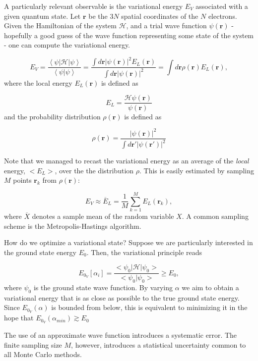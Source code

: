 \documentclass[10pt]{article}
\begin{document}
A particularly relevant observable is the variational energy $E_V$ associated with a given quantum state. Let $\bm r$ be the $3N$ spatial coordinates of the $N$ electrons. Given the Hamiltonian of the system $\mathcal{H}$, and a trial wave function $\psi (\bm r)$ - hopefully a good guess of the wave function representing some state of the system - one can compute the variational energy.

\begin{equation}\label{eq:variational_energy}
E_V = \frac{\left\langle \psi | \mathcal{H} | \psi \right \rangle}{\left\langle \psi | \psi \right \rangle} = \frac{ \int d\bm r |\psi (\bm r)|^2 E_L (\bm r)}{\int d\bm r | \psi (\bm r)|^2 } = \int d\bm r\rho (\bm r) E_L (\bm r) ,
\end{equation}
where the local energy $E_L (\bm r)$ is defined as

\begin{equation}\label{eq:local_energy}
E_L = \frac{\mathcal{H} \psi (\bm r) }{\psi (\bm r)}
\end{equation}
and the probability distribution $\rho (\bm r)$ is defined as

\begin{equation}\label{eq:rho}
\rho (\bm r) = \frac{ | \psi (\bm r) |^2}{ \int d\bm r' | \psi (\bm r') |^2}
\end{equation}

Note that we managed to recast the variational energy as an average  of the \emph{local} energy, $< E_L > $, over the the distribution $\rho$. This is easily estimated by sampling $M$ points $\bm r_k$ from $\rho (\bm r)$:

\begin{equation}\label{eq:average}
E_V \approx \overline E_L = \frac{1}{M} \sum_{k= 1}^{M} E_L (\bm r_k) ,
\end{equation}
where $\overline {X}$ denotes a sample mean of the random variable $X$. A common sampling scheme is the Metropolis-Hastings algorithm.

How do we optimize a variational state? Suppose we are particularly interested in the ground state energy $E_0$. Then, the variational principle reads

\begin{equation}
E_{0_V}[\alpha_i] = \frac{< \psi_0 | \mathcal{H} | \psi_0 >}{<\psi_0 | \psi_0>} \ge E_0,
\end{equation}
where $\psi_0$ is the ground state wave function. By varying $\alpha$ we aim to obtain a variational energy that is as close as possible to the true ground state energy. Since $E_{0_V}(\alpha)$ is bounded from below, this is equivalent to minimizing it in the hope that $E_{0_V}(\alpha_{min}) \gtrsim E_0$ 

The use of an approximate wave function introduces a systematic error. The finite sampling size $M$, however, introduces a statistical uncertainty common to all Monte Carlo methods. 
\end{document}
